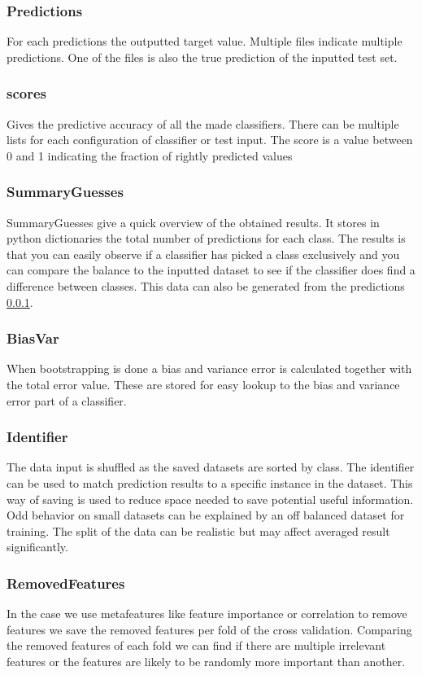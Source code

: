 \documentclass[a4paper,10pt]{article}
\begin{document}
\subsubsection{Predictions}\label{pred}
For each predictions the outputted target value. Multiple files indicate multiple predictions. One of the files is also the true prediction of the inputted test set. 

\subsubsection{scores}
Gives the predictive accuracy of all the made classifiers. There can be multiple lists for each configuration of classifier or test input. The score is a value between 0 and 1 indicating the fraction of rightly predicted values

\subsubsection{SummaryGuesses}
SummaryGuesses give a quick overview of the obtained results. It stores in python dictionaries the total number of predictions for each class. The results is that you can easily observe if a classifier has picked a class exclusively and you can compare the balance to the inputted dataset to see if the classifier does find a difference between classes. This data can also be generated from the predictions \ref{pred}.

\subsubsection{BiasVar}
When bootstrapping is done a bias and variance error is calculated together with the total error value. These are stored for easy lookup to the bias and variance error part of a classifier.

\subsubsection{Identifier}
The data input is shuffled as the saved datasets are sorted by class. The identifier can be used to match prediction results to a specific instance in the dataset. This way of saving is used to reduce space needed to save potential useful information. Odd behavior on small datasets can be explained by an off balanced dataset for training. The split of the data can be realistic but may affect averaged result significantly. 

\subsubsection{RemovedFeatures}
In the case we use metafeatures like feature importance or correlation to remove features we save the removed features per fold of the cross validation. Comparing the removed features of each fold we can find if there are multiple irrelevant features or the features are likely to be randomly more important than another.
\end{document}
